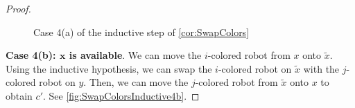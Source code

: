 \documentclass{amsart}
\newcommand{\vertex}[3][1]{
\node [circle,  fill, inner sep = 0pt,outer sep = 0pt, minimum size=#1mm] (#3) at #2 {};
}
\newcommand{\fg}[1]{
    \pgfdeclarelayer{foreground}
    \pgfsetlayers{main,foreground}
    \begin{pgfonlayer}{foreground}
    #1
    \end{pgfonlayer}
    }
\newcommand{\RedRobot}[2]{
\node [rectangle, cbred, fill, inner sep = 0pt,outer sep = 1pt, minimum size=2.3mm] (#2) at #1 {};
}
\newcommand{\GreenRobot}[2]{
\node [diamond, cbgreen, fill, inner sep = 0pt,outer sep = 1pt,minimum size=3mm] (#2) at #1 {};
}
\newcommand{\BlueRobot}[2]{
\node [isosceles triangle, shape border rotate=90,cbblue, fill, inner sep = 0pt,outer sep = 1pt,minimum size=2.5mm] (#2) at #1 {};
}
\theoremstyle{definition}
\theoremstyle{remark}
\begin{document}
\begin{proof}
\begin{figure}[h!]
        \quad
    \caption{Case 4(a) of the inductive step of \cref{cor:SwapColors}}
    \label{fig:SwapColorsInductive4a}
\end{figure}

\quad\textbf{Case 4(b): $\boldsymbol{x}$ is available}. We can move the $i$-colored robot from $x$ onto $\tilde x$. Using the inductive hypothesis, we can swap the $i$-colored robot on $\tilde x$ with the $j$-colored robot on $y$. Then, we can move the $j$-colored robot from $\tilde x$ onto $x$ to obtain $c'$.  See \cref{fig:SwapColorsInductive4b}.


\end{proof}
\end{document}
